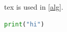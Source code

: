\documentclass{article}
\begin{document}
\gls{tex} is used in \cref{alg}.
\begin{lstlisting}[language=Python]
print("hi")
\end{lstlisting}
\begin{algorithm}\caption{Noop}\label{alg}\end{algorithm}
\printglossaries
\end{document}
